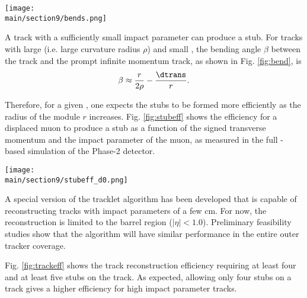 \begin{figure*}[hbtp]\centering
 \texttt{[image: \\main/section9/bends.png]}
 \caption{A sketch of a track crossing a \pt-module.}
  \label{fig:bend}
\end{figure*}%

A track with a sufficiently small impact parameter can produce a stub.
For tracks with large \pt (i.e. large curvature radius $\rho$) and small \dtrans,
the bending angle $\beta$ between the track and the prompt infinite momentum track, as shown in Fig. \ref{fig:bend}, is
\begin{equation*}
  \beta \approx \frac{r}{2\rho} - \frac{\dtrans}{r}.
\end{equation*}

Therefore, for a given \dtrans, one expects the stubs to be formed more efficiently as the radius of the module $r$ increases.
Fig. \ref{fig:stubeff} shows the efficiency for a displaced muon to produce a stub as a function of the signed transverse momentum and the impact parameter
of the muon, as measured in the full \GEANTfour-based simulation of the Phase-2 detector. 

\begin{figure*}[hbtp]\centering
 \texttt{[image: \\main/section9/stubeff\_d0.png]}
 \caption{The efficiency for a displaced muon to form stubs in the six barrel layers of the Phase-2 tracker, as a function of the signed muon \pt and impact parameter.
 The top row shows, from left to right, layers 1, 2, and 3;
 the bottom row shows layers 4, 5, and 6.
 The sample is comprised of 2000 muons generated with uniformly distributed transverse momentum between 2 and 8\UGeV and pseudorapidity $|\eta|<1$, and with the impact parameter \dtrans
 distributed as a Gaussian with width of 2\Ucm.}
  \label{fig:stubeff}
\end{figure*}

A special version of the tracklet algorithm \cite{cmstdr-014} has been developed that is capable of reconstructing tracks with impact parameters of a few cm.
For now, the reconstruction is limited to the barrel region ($|\eta|<1.0$). Preliminary feasibility studies show
that the algorithm will have similar performance in the entire outer tracker coverage. 

Fig. \ref{fig:trackeff} shows the track reconstruction efficiency requiring at least four and at least five stubs on the track. As expected, allowing
only four stubs on a track gives a higher efficiency for high impact parameter tracks.

